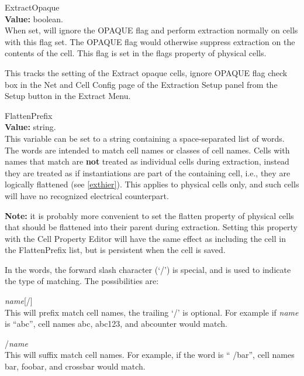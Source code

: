\begin{description}
\item{\et ExtractOpaque}\\
{\bf Value:} boolean.\\
When set, {\Xic} will ignore the {\vt OPAQUE} flag and perform
extraction normally on cells with this flag set.  The {\vt OPAQUE}
flag would otherwise suppress extraction on the contents of the cell. 
This flag is set in the {\et flags} property of physical cells.

This tracks the setting of the {\cb Extract opaque cells, ignore
OPAQUE flag} check box in the {\cb Net and Cell Config} page of the
{\cb Extraction Setup} panel from the {\cb Setup} button in the {\cb
Extract Menu}.

\item{\et FlattenPrefix}\\
{\bf Value:} string.\\
This variable can be set to a string containing a space-separated list
of words.  The words are intended to match cell names or classes of
cell names.  Cells with names that match are {\bf not} treated as
individual cells during extraction, instead they are treated as if
instantiations are part of the containing cell, i.e., they are
logically flattened (see \ref{exthier}).  This applies to physical
cells only, and such cells will have no recognized electrical
counterpart.

{\bf Note:} it is probably more convenient to set the {\et flatten}
property of physical cells that should be flattened into their parent
during extraction.  Setting this property with the {\cb Cell Property
Editor} will have the same effect as including the cell in the
{\et FlattenPrefix} list, but is persistent when the cell is saved.

In the words, the forward slash character (`/') is special, and is
used to indicate the type of matching.  The possibilities are:

\begin{description}
\item{{\it name\/}[/]}\\
This will prefix match cell names, the trailing `/' is optional.  For
example if {\it name} is ``{\vt abc}'', cell names {\vt abc}, {\vt
abc123}, and {\vt abcounter} would match.

\item{/{\it name}}\\
This will suffix match cell names.  For example, if the word is ``{\vt
/bar}'', cell names {\vt bar}, {\vt foobar}, and {\vt crossbar} would
match.


\end{description}
\end{description}
